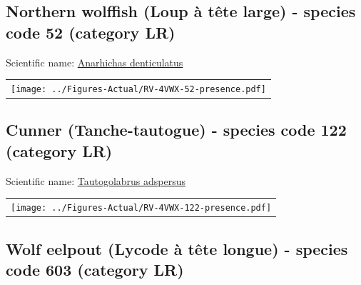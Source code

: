 \documentclass[12pt]{article}\usepackage[]{graphicx}\usepackage[]{color}
\begin{document}
\hypertarget{sec:52}{%
\subsection{Northern wolffish (Loup à tête large) - species code 52 (category LR)}\label{sec:52}}

  


Scientific name: \href{http://www.marinespecies.org/aphia.php?p=taxdetails\&id=126757}{Anarhichas denticulatus} \newline
\begin{minipage}{1.0\textwidth}
 \begin{tabular}{c}
\texttt{[image: ../Figures-Actual/RV-4VWX-52-presence.pdf]} \\ 
\end{tabular} 
\end{minipage}
\clearpage

\renewcommand\thefigure{\thesubsection\Alph{figure}}

\setcounter{figure}{0}

\hypertarget{sec:122}{%
\subsection{Cunner (Tanche-tautogue) - species code 122 (category LR)}\label{sec:122}}

  


Scientific name: \href{http://www.marinespecies.org/aphia.php?p=taxdetails\&id=159785}{Tautogolabrus adspersus} \newline
\begin{minipage}{1.0\textwidth}
 \begin{tabular}{c}
\texttt{[image: ../Figures-Actual/RV-4VWX-122-presence.pdf]} \\ 
\end{tabular} 
\end{minipage}
\clearpage

\renewcommand\thefigure{\thesubsection\Alph{figure}}

\setcounter{figure}{0}

\hypertarget{sec:603}{%
\subsection{Wolf eelpout (Lycode à tête longue) - species code 603 (category LR)}\label{sec:603}}
\end{document}
